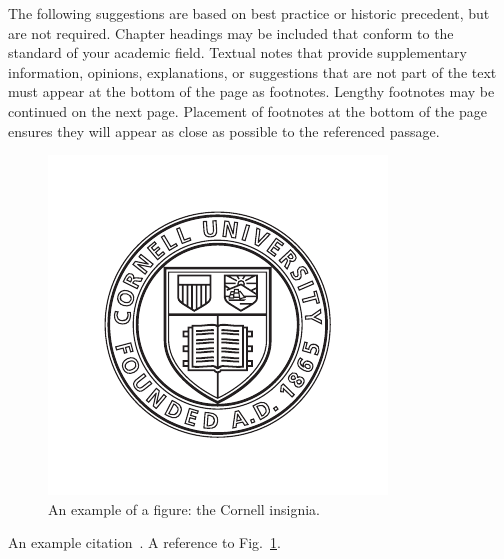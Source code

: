 \documentclass[letterpaper, 12pt, extrafontsizes, oneside]{memoir}
\begin{document}
The following suggestions are based on best practice or historic precedent, but are not required.
Chapter headings may be included that conform to the standard of your academic field.
Textual notes that provide supplementary information, opinions, explanations, or suggestions that are not part of the text must appear at the bottom of the page as footnotes.
Lengthy footnotes may be continued on the next page.
Placement of footnotes at the bottom of the page ensures they will appear as close as possible to the referenced passage.

\begin{figure}
 \includegraphics[width=\linewidth]{cu-insignia-black}
 \caption[An example figure]{
  An example of a figure: the Cornell insignia.
 }\label{fig:figure}
\end{figure}

An example citation~\citep{PhysRev.73.803}.  A reference to Fig.~\ref{fig:figure}.


\cleardoublepage


\backmatter

\SingleSpacing
\setlength{\bibsep}{2\baselineskip}

\end{document}
